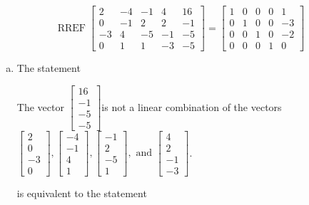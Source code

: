 \begin{exerciseAnswer} 
\[\operatorname{RREF}  \left[\begin{array}{cccc|c}
2 & -4 & -1 & 4 & 16 \\
0 & -1 & 2 & 2 & -1 \\
-3 & 4 & -5 & -1 & -5 \\
0 & 1 & 1 & -3 & -5
\end{array}\right] = \left[\begin{array}{cccc|c}
1 & 0 & 0 & 0 & 1 \\
0 & 1 & 0 & 0 & -3 \\
0 & 0 & 1 & 0 & -2 \\
0 & 0 & 0 & 1 & 0
\end{array}\right] \]
\begin{enumerate}[(a)]
\item  The statement 
\begin{center}\begin{minipage}{0.8\textwidth}
 The vector \( \left[\begin{array}{c}
16 \\
-1 \\
-5 \\
-5
\end{array}\right] \)is not a linear combination of the vectors \( \left[\begin{array}{c}
2 \\
0 \\
-3 \\
0
\end{array}\right] , \left[\begin{array}{c}
-4 \\
-1 \\
4 \\
1
\end{array}\right] , \left[\begin{array}{c}
-1 \\
2 \\
-5 \\
1
\end{array}\right] , \text{ and } \left[\begin{array}{c}
4 \\
2 \\
-1 \\
-3
\end{array}\right] \). 
\end{minipage}\end{center}
     is equivalent to the statement 
\begin{center}\begin{minipage}{0.8\textwidth}

\end{minipage}
\end{center}
\end{enumerate}
\end{exerciseAnswer}
